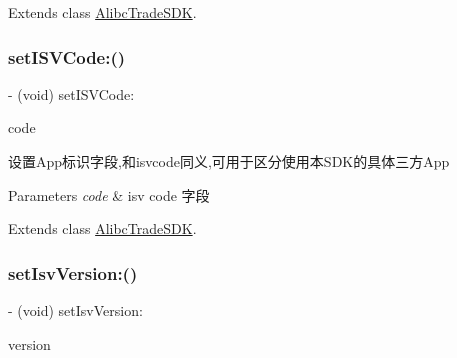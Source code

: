 Extends class \mbox{\hyperlink{interface_alibc_trade_s_d_k_aa0905a77885d33d44762a552acdcef2d}{Alibc\+Trade\+S\+DK}}.

\mbox{\label{category_alibc_trade_s_d_k_07_settings_08_a9e2f6b18663323c17cdcfa8fc42e0c32}} 
\subsubsection{\texorpdfstring{set\+I\+S\+V\+Code\+:()}{setISVCode:()}}
{\footnotesize\ttfamily -\/ (void) set\+I\+S\+V\+Code\+: \begin{DoxyParamCaption}\item[{(N\+S\+String $\ast$)}]{code }\end{DoxyParamCaption}}

设置\+App标识字段,和isvcode同义,可用于区分使用本\+S\+D\+K的具体三方\+App


\begin{DoxyParams}{Parameters}
{\em code} & isv code 字段 \\
\hline
\end{DoxyParams}


Extends class \mbox{\hyperlink{interface_alibc_trade_s_d_k_a9e2f6b18663323c17cdcfa8fc42e0c32}{Alibc\+Trade\+S\+DK}}.

\mbox{\label{category_alibc_trade_s_d_k_07_settings_08_aaf25692948a3bcad5f2099789c92b5c8}} 
\subsubsection{\texorpdfstring{set\+Isv\+Version\+:()}{setIsvVersion:()}}
{\footnotesize\ttfamily -\/ (void) set\+Isv\+Version\+: \begin{DoxyParamCaption}\item[{(N\+S\+String $\ast$)}]{version }\end{DoxyParamCaption}}

